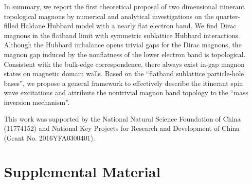 \documentclass[amsmath,superscriptaddress,showpacs,aps,prl,twocolumn]{revtex4-1}
\begin{document}
\par In summary, we report the first theoretical proposal of two dimensional itinerant topological magnons by numerical and analytical investigations on the quarter- filled Haldane Hubbard model with a nearly flat electron band. We find Dirac magnons in the flatband limit with symmetric sublattice Hubbard interactions. Although the Hubbard imbalance opens trivial gaps for the Dirac magnons, the magnon gap induced by the nonflatness of the lower electron band is topological. Consistent with the bulk-edge correspondence, there always exist in-gap magnon states on magnetic domain walls. Based on the ``flatband sublattice particle-hole bases'', we propose a general framework to effectively describe the itinerant spin wave excitations and attribute the nontrivial magnon band topology to the ``mass inversion mechanism''.

\begin{acknowledgments}
\par This work was supported by the National Natural Science Foundation of China (11774152) and National Key Projects for Research and Development of China (Grant No. 2016YFA0300401).
\end{acknowledgments}



\widetext
\newpage
\appendix
\section{Supplemental Material}

\setcounter{equation}{0}
\setcounter{figure}{0}
\setcounter{table}{0}
\setcounter{section}{0}
\renewcommand{\theequation}{S\arabic{equation}}
\renewcommand{\thesection}{S\arabic{section}}
\renewcommand{\thetable}{S\arabic{table}}
\renewcommand{\thefigure}{S\arabic{figure}}
\end{document}
